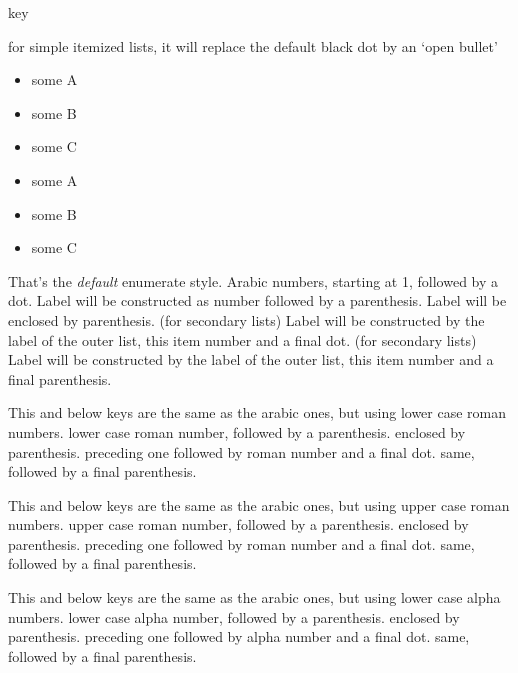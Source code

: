\documentclass[article,nogeometry,english,tocdepth=3,secdepth=3]{ufrgscca} %
\begin{document}
\begin{describelist}{key}


	 { for simple itemized lists, it will replace the default black dot by an `open bullet'}
\newpage
	\begin{codestore}[st=enumD]
	\begin{itemize}[tcc,miditemsep]
		\item some A
		\item some B
		\item some C
	\end{itemize}
	\begin{itemize}[tcc,bullet,miditemsep]
		\item some A
		\item some B
		\item some C
	\end{itemize}
\end{codestore}



	 { That's the \emph{default} enumerate style. Arabic numbers, starting at 1, followed by a dot.}
	 { Label will be constructed as number followed by a parenthesis.}
	 { Label will be enclosed by parenthesis.}
	 { (for secondary lists) Label will be constructed by the label of the outer list, this item number and a final dot.}
	 { (for secondary lists) Label will be constructed by the label of the outer list, this item number and a final parenthesis.}

	 { This and below keys are the same as the arabic ones, but using lower case roman numbers.}
	 { lower case roman number, followed by a parenthesis.}
	 { enclosed by parenthesis.}
	 { preceding one followed by roman number and a final dot.}
	 { same, followed by a final parenthesis.}

	 { This and below keys are the same as the arabic ones, but using upper case roman numbers.}
	 { upper case roman number, followed by a parenthesis.}
	 { enclosed by parenthesis.}
	 { preceding one followed by roman number and a final dot.}
	 { same, followed by a final parenthesis.}

	 { This and below keys are the same as the arabic ones, but using lower case alpha numbers.}
	 { lower case alpha number, followed by a parenthesis.}
	 { enclosed by parenthesis.}
	 { preceding one followed by alpha number and a final dot.}
	 { same, followed by a final parenthesis.}


\end{describelist}
\end{document}
